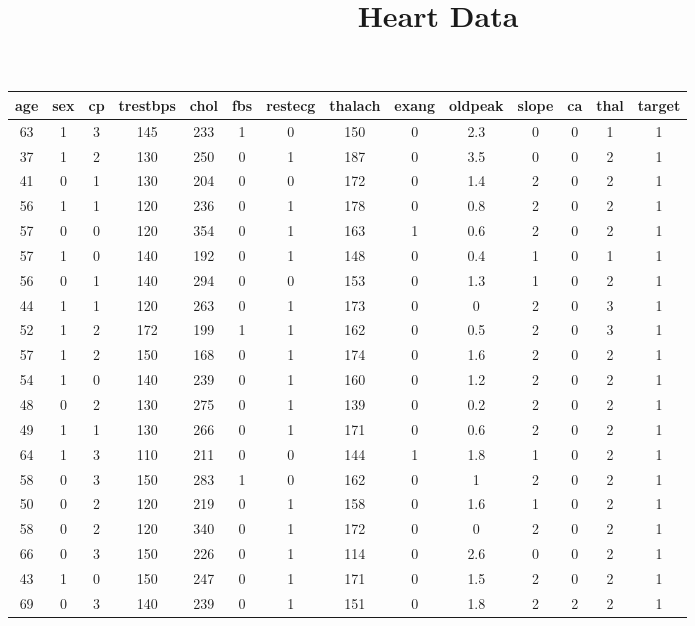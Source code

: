 \documentclass{article}
\title{Heart Data}
\begin{document}
\maketitle
\begin{longtable}{|c|c|c|c|c|c|c|c|c|c|c|c|c|c|}
\hline
age & sex & cp & trestbps & chol & fbs & restecg & thalach & exang & oldpeak & slope & ca & thal & target\\
\hline
\endfirsthead
\hline
63 & 1 & 3 & 145 & 233 & 1 & 0 & 150 & 0 & 2.3 & 0 & 0 & 1 & 1\\
\hline
37 & 1 & 2 & 130 & 250 & 0 & 1 & 187 & 0 & 3.5 & 0 & 0 & 2 & 1\\
\hline
41 & 0 & 1 & 130 & 204 & 0 & 0 & 172 & 0 & 1.4 & 2 & 0 & 2 & 1\\
\hline
56 & 1 & 1 & 120 & 236 & 0 & 1 & 178 & 0 & 0.8 & 2 & 0 & 2 & 1\\
\hline
57 & 0 & 0 & 120 & 354 & 0 & 1 & 163 & 1 & 0.6 & 2 & 0 & 2 & 1\\
\hline
57 & 1 & 0 & 140 & 192 & 0 & 1 & 148 & 0 & 0.4 & 1 & 0 & 1 & 1\\
\hline
56 & 0 & 1 & 140 & 294 & 0 & 0 & 153 & 0 & 1.3 & 1 & 0 & 2 & 1\\
\hline
44 & 1 & 1 & 120 & 263 & 0 & 1 & 173 & 0 & 0 & 2 & 0 & 3 & 1\\
\hline
52 & 1 & 2 & 172 & 199 & 1 & 1 & 162 & 0 & 0.5 & 2 & 0 & 3 & 1\\
\hline
57 & 1 & 2 & 150 & 168 & 0 & 1 & 174 & 0 & 1.6 & 2 & 0 & 2 & 1\\
\hline
54 & 1 & 0 & 140 & 239 & 0 & 1 & 160 & 0 & 1.2 & 2 & 0 & 2 & 1\\
\hline
48 & 0 & 2 & 130 & 275 & 0 & 1 & 139 & 0 & 0.2 & 2 & 0 & 2 & 1\\
\hline
49 & 1 & 1 & 130 & 266 & 0 & 1 & 171 & 0 & 0.6 & 2 & 0 & 2 & 1\\
\hline
64 & 1 & 3 & 110 & 211 & 0 & 0 & 144 & 1 & 1.8 & 1 & 0 & 2 & 1\\
\hline
58 & 0 & 3 & 150 & 283 & 1 & 0 & 162 & 0 & 1 & 2 & 0 & 2 & 1\\
\hline
50 & 0 & 2 & 120 & 219 & 0 & 1 & 158 & 0 & 1.6 & 1 & 0 & 2 & 1\\
\hline
58 & 0 & 2 & 120 & 340 & 0 & 1 & 172 & 0 & 0 & 2 & 0 & 2 & 1\\
\hline
66 & 0 & 3 & 150 & 226 & 0 & 1 & 114 & 0 & 2.6 & 0 & 0 & 2 & 1\\
\hline
43 & 1 & 0 & 150 & 247 & 0 & 1 & 171 & 0 & 1.5 & 2 & 0 & 2 & 1\\
\hline
69 & 0 & 3 & 140 & 239 & 0 & 1 & 151 & 0 & 1.8 & 2 & 2 & 2 & 1\\

\end{longtable}
\end{document}
